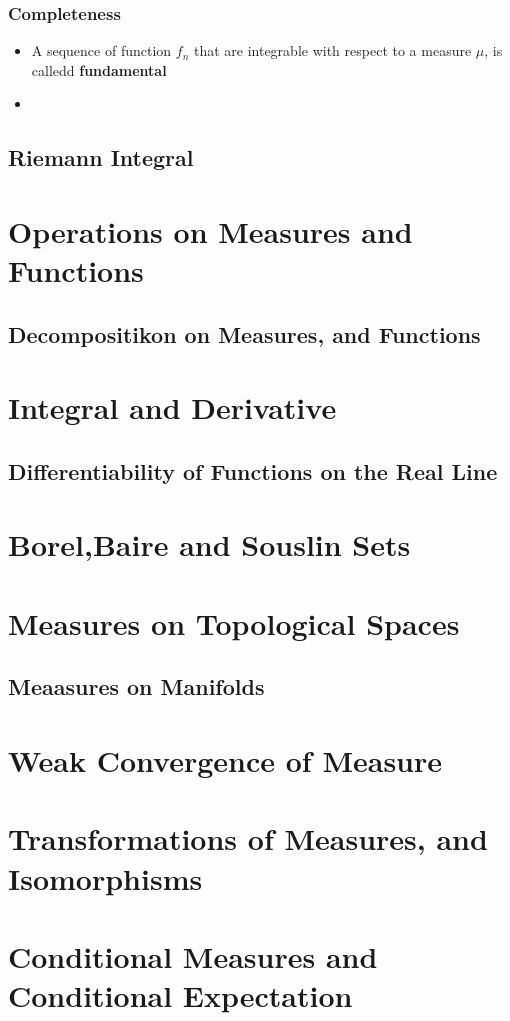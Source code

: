 \documentclass[Total.tex]{subfiles}
\begin{document}
			\subsection{Completeness}
			\begin{Def}
				\begin{itemize}
					\item A sequence of function $f_n$ that are integrable with respect to a measure $\mu$, is calledd \textbf{fundamental}
					\item 
				\end{itemize}
			\end{Def}
		\section{Riemann Integral}
	\chapter{Operations on Measures and Functions}
		\section{Decompositikon on Measures, and Functions}
	\chapter{Integral and Derivative}
		\section{Differentiability of Functions on the Real Line}
		
	\chapter{Borel,Baire and Souslin Sets}
	\chapter{Measures on Topological Spaces}
		\section{Meaasures on Manifolds}
	\chapter{Weak Convergence of Measure}
	\chapter{Transformations of Measures, and Isomorphisms}
	\chapter{Conditional Measures and Conditional Expectation}
		
\end{document}
